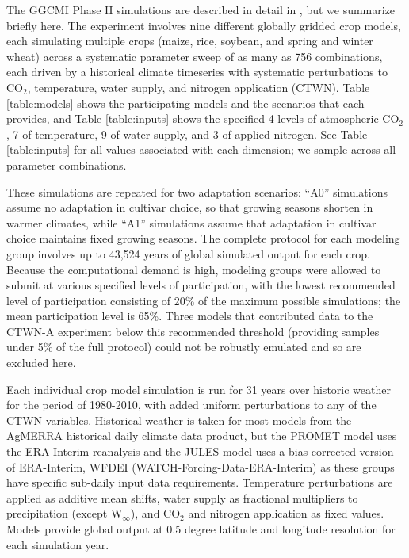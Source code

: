 \documentclass[gmd, manuscript]{copernicus} %
\begin{document}
The GGCMI Phase II simulations are described in detail in \citet{Franke2019a}, but we summarize briefly here. 
The experiment involves nine different globally gridded crop models, each simulating multiple crops (maize, rice, soybean, and spring and winter wheat) across a systematic parameter sweep of as many as 756 combinations, each driven by a historical climate timeseries with systematic perturbations to CO$_2$, temperature, water supply, and nitrogen application (CTWN). 
Table \ref{table:models} shows the participating models and the scenarios that each provides, and Table \ref{table:inputs} shows the specified 4 levels of atmospheric CO$_2$, 7 of temperature, 9 of water supply, and 3 of applied nitrogen. 
See Table \ref{table:inputs} for all values associated with each dimension; we sample across all parameter combinations.

These simulations are repeated for two adaptation scenarios: ``A0'' simulations assume no adaptation in cultivar choice, so that growing seasons shorten in warmer climates, while ``A1'' simulations assume that adaptation in cultivar choice maintains fixed growing seasons. 
The complete protocol for each modeling group involves up to 43,524 years %
of global simulated output for each crop.
Because the computational demand is high, modeling groups were allowed to submit at various specified levels of participation, with the lowest recommended level of participation consisting of 20\% of the maximum possible simulations; the mean participation level is 65\%. 
Three models that contributed data to the CTWN-A experiment \citep{Franke2019a} below this recommended threshold (providing samples under 5\% of the full protocol) could not be robustly emulated and so are excluded here.

Each individual crop model simulation is run for 31 years over historic weather for the period of 1980-2010, with added uniform perturbations to any of the CTWN variables.
Historical weather is taken for most models from the AgMERRA \citep{Ruane2015} historical daily climate data product, but the PROMET model uses the ERA-Interim reanalysis \citep{dee2011era} and the JULES model uses a bias-corrected version of ERA-Interim, WFDEI (WATCH-Forcing-Data-ERA-Interim) \citep{weedon2014wfdei} as these groups have specific sub-daily input data requirements. 
Temperature perturbations are applied as additive mean shifts, water supply as fractional multipliers to precipitation (except W$_{\infty}$), and CO$_2$ and nitrogen application as fixed values. 
Models provide global output at 0.5 degree latitude and longitude resolution for each simulation year.
\end{document}
